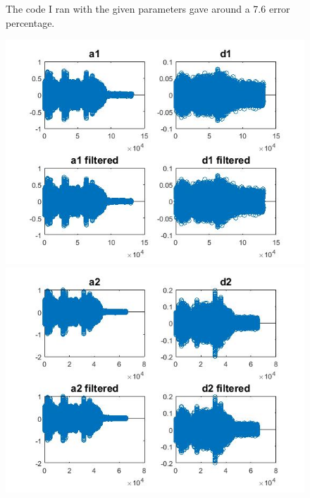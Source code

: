 \documentclass{article}
\begin{document}
\begin{figure}[H]
The code I ran with the given parameters gave around a 7.6 error percentage. 

\includegraphics[scale=.5]{a1d1}
\includegraphics[scale=.5]{a2d2}

  \end{figure}
\end{document}
